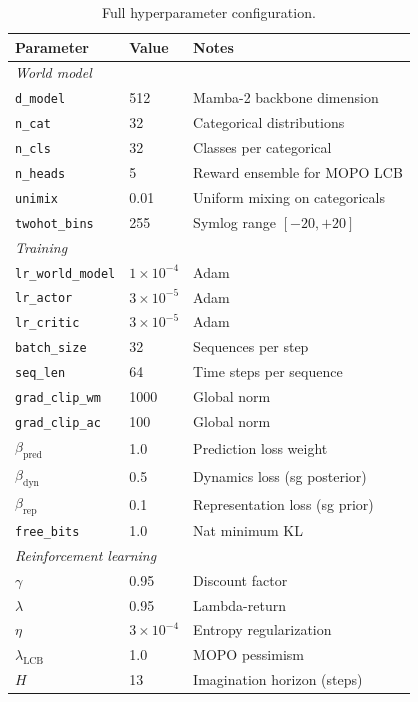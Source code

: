 \begin{table}[h]
\centering
\caption{Full hyperparameter configuration.}
\label{tab:hyperparams-full}
\small
\begin{tabular}{@{}lll@{}}
\toprule
\textbf{Parameter} & \textbf{Value} & \textbf{Notes} \\
\midrule
\multicolumn{3}{l}{\textit{World model}} \\
\texttt{d\_model} & 512 & Mamba-2 backbone dimension \\
\texttt{n\_cat} & 32 & Categorical distributions \\
\texttt{n\_cls} & 32 & Classes per categorical \\
\texttt{n\_heads} & 5 & Reward ensemble for MOPO LCB \\
\texttt{unimix} & 0.01 & Uniform mixing on categoricals \\
\texttt{twohot\_bins} & 255 & Symlog range $[-20, +20]$ \\
\midrule
\multicolumn{3}{l}{\textit{Training}} \\
\texttt{lr\_world\_model} & $1 \times 10^{-4}$ & Adam \\
\texttt{lr\_actor} & $3 \times 10^{-5}$ & Adam \\
\texttt{lr\_critic} & $3 \times 10^{-5}$ & Adam \\
\texttt{batch\_size} & 32 & Sequences per step \\
\texttt{seq\_len} & 64 & Time steps per sequence \\
\texttt{grad\_clip\_wm} & 1000 & Global norm \\
\texttt{grad\_clip\_ac} & 100 & Global norm \\
\texttt{$\beta_{\text{pred}}$} & 1.0 & Prediction loss weight \\
\texttt{$\beta_{\text{dyn}}$} & 0.5 & Dynamics loss (sg posterior) \\
\texttt{$\beta_{\text{rep}}$} & 0.1 & Representation loss (sg prior) \\
\texttt{free\_bits} & 1.0 & Nat minimum KL \\
\midrule
\multicolumn{3}{l}{\textit{Reinforcement learning}} \\
$\gamma$ & 0.95 & Discount factor \\
$\lambda$ & 0.95 & Lambda-return \\
$\eta$ & $3 \times 10^{-4}$ & Entropy regularization \\
$\lambda_{\text{LCB}}$ & 1.0 & MOPO pessimism \\
$H$ & 13 & Imagination horizon (steps) \\

\end{tabular}
\end{table}
